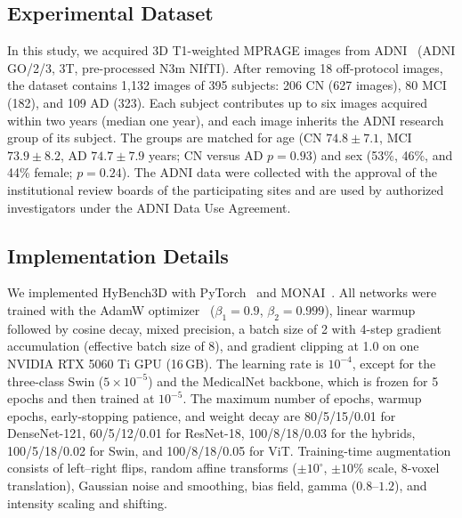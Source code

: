 \documentclass[conference,a4paper]{IEEEtran}
\begin{document}
\subsection{Experimental Dataset}
In this study, we acquired 3D T1-weighted MPRAGE images from ADNI~\cite{jack2008adni,petersen2010adni} (ADNI GO/2/3, 3T, pre-processed N3m NIfTI). After removing 18 off-protocol images, the dataset contains 1{,}132 images of 395 subjects: 206 CN (627 images), 80 MCI (182), and 109 AD (323). Each subject contributes up to six images acquired within two years (median one year), and each image inherits the ADNI research group of its subject. The groups are matched for age (CN $74.8\pm7.1$, MCI $73.9\pm8.2$, AD $74.7\pm7.9$ years; CN versus AD $p=0.93$) and sex (53\%, 46\%, and 44\% female; $p=0.24$). The ADNI data were collected with the approval of the institutional review boards of the participating sites and are used by authorized investigators under the ADNI Data Use Agreement.

\subsection{Implementation Details}
We implemented HyBench3D with PyTorch~\cite{paszke2019pytorch} and MONAI~\cite{cardoso2022monai}. All networks were trained with the AdamW optimizer~\cite{loshchilov2019decoupled} ($\beta_1=0.9$, $\beta_2=0.999$), linear warmup followed by cosine decay, mixed precision, a batch size of 2 with 4-step gradient accumulation (effective batch size of 8), and gradient clipping at 1.0 on one NVIDIA RTX 5060 Ti GPU (16\,GB). The learning rate is $10^{-4}$, except for the three-class Swin ($5\times10^{-5}$) and the MedicalNet backbone, which is frozen for 5 epochs and then trained at $10^{-5}$. The maximum number of epochs, warmup epochs, early-stopping patience, and weight decay are 80/5/15/0.01 for DenseNet-121, 60/5/12/0.01 for ResNet-18, 100/8/18/0.03 for the hybrids, 100/5/18/0.02 for Swin, and 100/8/18/0.05 for ViT. Training-time augmentation consists of left--right flips, random affine transforms ($\pm10^\circ$, $\pm10\%$ scale, 8-voxel translation), Gaussian noise and smoothing, bias field, gamma ($0.8$--$1.2$), and intensity scaling and shifting.
\end{document}
